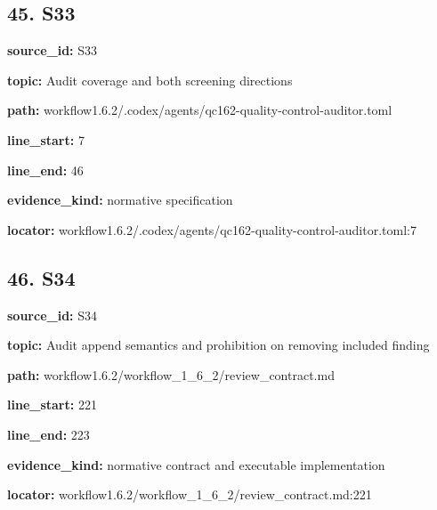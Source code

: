 \documentclass[10pt,a4paper]{article}
\begin{document}
\subsection*{45.\allowbreak{} S33}
\textbf{source\_\allowbreak{}id:} S33\par
\textbf{topic:} Audit coverage and both screening directions\par
\textbf{path:} workflow1.\allowbreak{}6.\allowbreak{}2/\allowbreak{}.\allowbreak{}codex/\allowbreak{}agents/\allowbreak{}qc162-\allowbreak{}quality-\allowbreak{}control-\allowbreak{}auditor.\allowbreak{}toml\par
\textbf{line\_\allowbreak{}start:} 7\par
\textbf{line\_\allowbreak{}end:} 46\par
\textbf{evidence\_\allowbreak{}kind:} normative specification\par
\textbf{locator:} workflow1.\allowbreak{}6.\allowbreak{}2/\allowbreak{}.\allowbreak{}codex/\allowbreak{}agents/\allowbreak{}qc162-\allowbreak{}quality-\allowbreak{}control-\allowbreak{}auditor.\allowbreak{}toml:7\par
\subsection*{46.\allowbreak{} S34}
\textbf{source\_\allowbreak{}id:} S34\par
\textbf{topic:} Audit append semantics and prohibition on removing included finding\par
\textbf{path:} workflow1.\allowbreak{}6.\allowbreak{}2/\allowbreak{}workflow\_\allowbreak{}1\_\allowbreak{}6\_\allowbreak{}2/\allowbreak{}review\_\allowbreak{}contract.\allowbreak{}md\par
\textbf{line\_\allowbreak{}start:} 221\par
\textbf{line\_\allowbreak{}end:} 223\par
\textbf{evidence\_\allowbreak{}kind:} normative contract and executable implementation\par
\textbf{locator:} workflow1.\allowbreak{}6.\allowbreak{}2/\allowbreak{}workflow\_\allowbreak{}1\_\allowbreak{}6\_\allowbreak{}2/\allowbreak{}review\_\allowbreak{}contract.\allowbreak{}md:221\par
\end{document}
